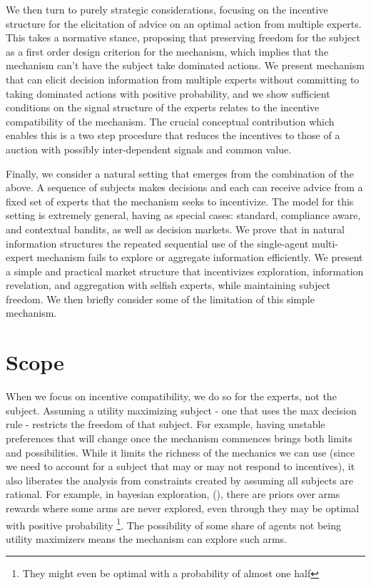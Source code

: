 We then turn to purely strategic considerations, focusing on the incentive structure for the elicitation of advice on an optimal action from multiple experts.
This takes a normative stance, proposing that preserving freedom for the subject as a first order design criterion for the mechanism, which implies that the mechanism can't have the subject take dominated actions.
We present mechanism that can elicit decision information from multiple experts without committing to taking dominated actions with positive probability, and we show sufficient conditions on the signal structure of the experts relates to the incentive compatibility of the mechanism.
The crucial conceptual contribution which enables this is a two step procedure that reduces the incentives to those of a auction with possibly inter-dependent signals and common value. 


Finally, we consider a natural setting that emerges from the combination of the above. A sequence of subjects makes decisions and each can receive advice from a fixed set of experts that the mechanism seeks to incentivize.
The model for this setting is extremely general, having as special cases: standard, compliance aware, and contextual bandits, as well as decision markets.
We prove that in natural information structures the repeated sequential use of the single-agent multi-expert mechanism fails to explore or aggregate information efficiently.
We present a simple and practical market structure that incentivizes exploration, information revelation, and aggregation with selfish experts, while maintaining subject freedom. We then briefly consider some of the limitation of this simple mechanism.


\section{Scope}

When we focus on incentive compatibility, we do so for the experts, not the subject.
Assuming a utility maximizing subject - one that uses the max decision rule - restricts the freedom of that subject.
For example, having unstable preferences that will change once the mechanism commences brings both limits and possibilities.
While it limits the richness of the mechanics we can use (since we need to account for a subject that may or may not respond to incentives), it also liberates the analysis from constraints created by assuming all subjects are rational.
For example, in bayesian  exploration, (\cite{mansour2015bayesian}), there are priors over arms rewards where some arms are never explored, even through they may be optimal with positive probability \footnote{They might even be optimal with a probability of almost one half}. The possibility of some share of agents not being utility maximizers means the mechanism can explore such arms.


